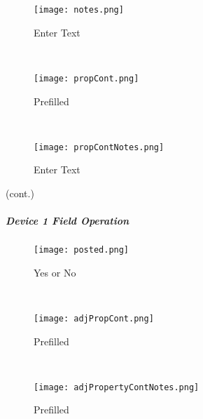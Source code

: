 \begin{wrapfigure}{r}{0.4\textwidth}
\centering
    \texttt{[image: notes.png]}%
\caption {Enter Text}
\vspace{.05in}

\HRule \\[.4cm] %
\vspace{.1in}

    \texttt{[image: propCont.png]}%
\caption {Prefilled}
\vspace{.05in}

\HRule \\[.4cm] %
\vspace{.1in}

    \texttt{[image: propContNotes.png]}
\caption{Enter Text}
\end{wrapfigure}

{\footnotesize (cont.)}
\vspace{.5in}

\vspace{2.25in}

\vspace{3.25in}

\clearpage

\subparagraph*{Device 1 Field Operation}
\begin{wrapfigure}{r}{0.4\textwidth}
\centering
    \texttt{[image: posted.png]} %
\caption{Yes or No}
\vspace{.05in}

\HRule \\[.4cm] %
\vspace{.1in}

    \texttt{[image: adjPropCont.png]} %
\caption{Prefilled}
\vspace{.05in}

\HRule \\[.4cm] %
\vspace{.1in}

    \texttt{[image: adjPropertyContNotes.png]}
\caption{Prefilled}
\end{wrapfigure}




